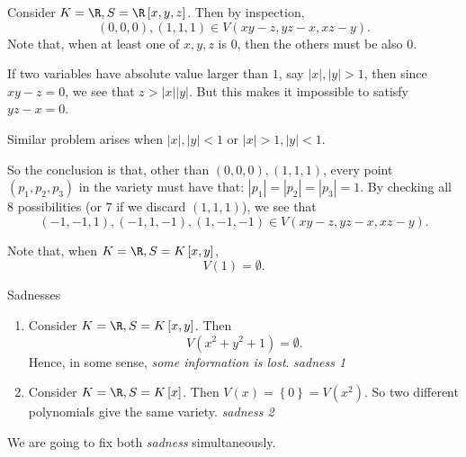 \documentclass[co439]{subfiles}
\begin{document}
    \begin{example}{}
        Consider $K=\R, S=\R\left[ x,y,z \right]$. Then by inspection,
        \begin{equation*}
            \left( 0,0,0 \right), \left( 1,1,1 \right) \in V\left( xy-z, yz-x, xz-y \right) .
        \end{equation*}
        Note that, when at least one of $x,y,z$ is $0$, then the others must be also $0$.

        If two variables have absolute value larger than $1$, say $\left| x \right|, \left| y \right|>1$, then since $xy-z=0$, we see that $z>\left| x \right|\left| y \right|$. But this makes it impossible to satisfy $yz-x=0$.

        Similar problem arises when $\left| x \right|,\left| y \right|<1$ or $\left| x \right|>1, \left| y \right|<1$.

        So the conclusion is that, other than $\left( 0,0,0 \right), \left( 1,1,1 \right)$, every point $\left( p_1,p_2,p_3 \right)$ in the variety must have that: $\left| p_1 \right|=\left| p_2 \right|=\left| p_3 \right|=1$. By checking all $8$ possibilities (or $7$ if we discard $\left( 1,1,1 \right)$), we see that 
        \begin{equation*}
            \left( -1,-1,1 \right),\left( -1,1,-1 \right),\left( 1,-1,-1 \right)\in V\left( xy-z,yz-x,xz-y \right).
        \end{equation*}
    \end{example}

    \rruleline

    \begin{example}{}
        Note that, when $K=\R, S= K\left[ x,y \right]$,
        \begin{equation*}
            V\left( 1 \right) = \emptyset.
        \end{equation*}
    \end{example}

    \rruleline

    \begin{example}{Sadnesses}
        \vspace{-11pt}
        \begin{enumerate}
            \item Consider $K=\R,S=K\left[ x,y \right]$. Then
                \begin{equation*}
                    V\left( x^{2}+y^{2}+1 \right) = \emptyset.
                \end{equation*}
                Hence, in some sense, \textit{some information is lost}. \hfill\textit{sadness 1}

            \item Consider $K=\R,S=K\left[ x \right]$. Then $V\left( x \right) = \left\lbrace 0 \right\rbrace = V\left( x^{2} \right)$. So two different polynomials give the same variety. \hfill\textit{sadness 2}
        \end{enumerate}
        We are going to fix both \textit{sadness} simultaneously.
    \end{example}
\end{document}
